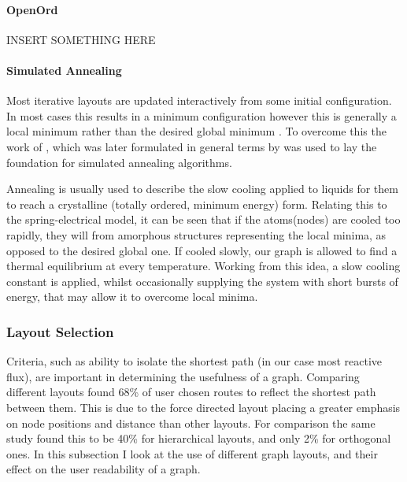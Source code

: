 \paragraph{OpenOrd}



INSERT SOMETHING HERE 


\paragraph*{Simulated Annealing}
Most iterative layouts are updated interactively from some initial configuration. In most cases this results in a minimum configuration however this is generally a local minimum rather than the desired global minimum \cite{nicelyanneal}. To overcome this the work of \cite{metropolis}, which was later formulated in general terms by \cite{kirkpatrick} was used to lay the foundation for simulated annealing algorithms.

Annealing is usually used to describe the slow cooling applied to liquids for them to reach a crystalline (totally ordered, minimum energy) form. Relating this to the spring-electrical model, it can be seen that if the atoms(nodes) are cooled too rapidly, they will from amorphous structures representing the local minima, as opposed to the desired global one.  If cooled slowly, our graph is allowed to find a thermal equilibrium at every temperature. Working from this idea, a slow cooling constant is applied, whilst occasionally supplying the system with short bursts of energy, that may allow it to overcome local minima. 





\subsubsection{Layout Selection}

Criteria, such as ability to isolate the shortest path (in our case most reactive flux), are important in determining the usefulness of a graph. Comparing different layouts \cite{eyetrack} found 68\% of user chosen routes to reflect the shortest path between them. This is due to the force directed layout placing a greater emphasis on node positions and distance than other layouts. For comparison the same study found this to be 40\% for hierarchical layouts, and only 2\% for orthogonal ones. In this subsection I look at the use of different graph layouts, and their effect on the user readability of a graph. 


